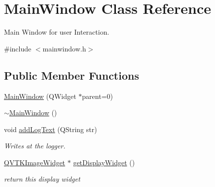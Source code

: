 \hypertarget{class_main_window}{\section{Main\-Window Class Reference}
\label{d9/dc6/class_main_window}
}


Main Window for user Interaction.  




{\ttfamily \#include $<$mainwindow.\-h$>$}

\subsection*{Public Member Functions}
\begin{DoxyCompactItemize}
\item 
\hyperlink{class_main_window_a8b244be8b7b7db1b08de2a2acb9409db}{Main\-Window} (Q\-Widget $\ast$parent=0)
\item 
\hyperlink{class_main_window_ae98d00a93bc118200eeef9f9bba1dba7}{$\sim$\-Main\-Window} ()
\item 
void \hyperlink{class_main_window_a02dc93b38c4cf808db9d26e59521ec0b}{add\-Log\-Text} (Q\-String str)
\begin{DoxyCompactList}\small\item\em Writes at the logger. \end{DoxyCompactList}\item 
\hyperlink{class_q_v_t_k_image_widget}{Q\-V\-T\-K\-Image\-Widget} $\ast$ \hyperlink{class_main_window_ab31ca15852fe0ccb8d7571251b9940a0}{get\-Display\-Widget} ()
\begin{DoxyCompactList}\small\item\em return this display widget \end{DoxyCompactList}\end{DoxyCompactItemize}
